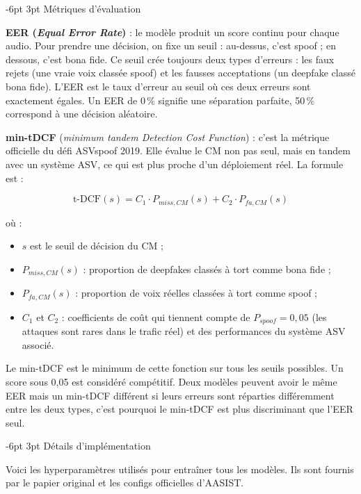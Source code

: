 \documentclass[10pt, a4paper]{article}
\makeatletter
\renewcommand{\subsection}{\@startsection{subsection}{2}{\z@}%
  {-6pt \@plus -2pt \@minus -1pt}{3pt \@plus 1pt}%
  {\normalfont\large\bfseries}}
\makeatother
\begin{document}
\subsection{Métriques d'évaluation}

\textbf{EER (\textit{Equal Error Rate})} : le modèle produit un score continu pour chaque audio. Pour prendre une décision, on fixe un seuil : au-dessus, c'est spoof ; en dessous, c'est bona fide. Ce seuil crée toujours deux types d'erreurs : les faux rejets (une vraie voix classée spoof) et les fausses acceptations (un deepfake classé bona fide). L'EER est le taux d'erreur au seuil où ces deux erreurs sont exactement égales. Un EER de 0\,\% signifie une séparation parfaite, 50\,\% correspond à une décision aléatoire.

\textbf{min-tDCF} (\textit{minimum tandem Detection Cost Function}) : c'est la métrique officielle du défi ASVspoof 2019. Elle évalue le CM non pas seul, mais en tandem avec un système ASV, ce qui est plus proche d'un déploiement réel. La formule est :

\[
  \text{t-DCF}(s) = C_1 \cdot P_{miss,CM}(s) + C_2 \cdot P_{fa,CM}(s)
\]

où :
\begin{itemize}
  \item $s$ est le seuil de décision du CM ;
  \item $P_{miss,CM}(s)$ : proportion de deepfakes classés à tort comme bona fide ;
  \item $P_{fa,CM}(s)$ : proportion de voix réelles classées à tort comme spoof ;
  \item $C_1$ et $C_2$ : coefficients de coût qui tiennent compte de $P_{spoof} = 0{,}05$ (les attaques sont rares dans le trafic réel) et des performances du système ASV associé.
\end{itemize}

Le min-tDCF est le minimum de cette fonction sur tous les seuils possibles. Un score sous 0,05 est considéré compétitif. Deux modèles peuvent avoir le même EER mais un min-tDCF différent si leurs erreurs sont réparties différemment entre les deux types, c'est pourquoi le min-tDCF est plus discriminant que l'EER seul.

\subsection{Détails d'implémentation}

Voici les hyperparamètres utilisés pour entraîner tous les modèles. Ils sont fournis par le papier original et les configs officielles d'AASIST.
\end{document}
